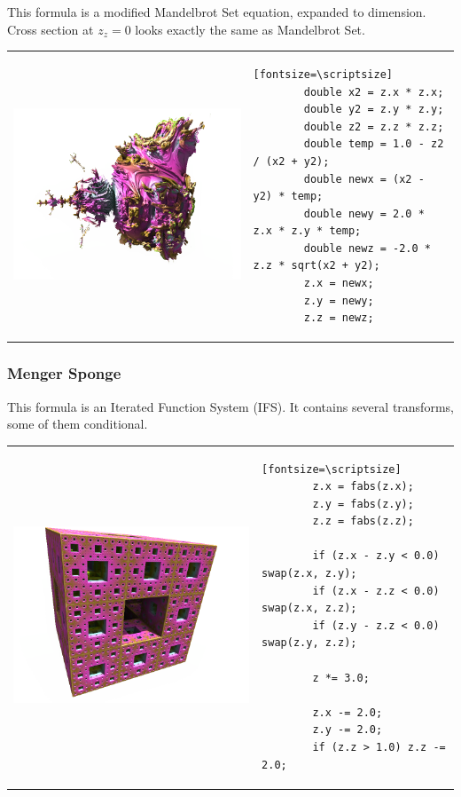 This formula is a modified Mandelbrot Set equation, expanded to  dimension.
Cross section at $ z_z = 0 $ looks exactly the same as Mandelbrot Set.
\nopagebreak

\begin{tabular}{l l}
	\includegraphics[width=0.3\linewidth]{img/manual/media/formula_mandelbulb_power_2}	
	& 
	\begin{minipage}[b]{0.5\linewidth}
		\begin{verbatim}[fontsize=\scriptsize]
		double x2 = z.x * z.x;
		double y2 = z.y * z.y;
		double z2 = z.z * z.z;
		double temp = 1.0 - z2 / (x2 + y2);
		double newx = (x2 - y2) * temp;
		double newy = 2.0 * z.x * z.y * temp;
		double newz = -2.0 * z.z * sqrt(x2 + y2);
		z.x = newx;
		z.y = newy;
		z.z = newz;
		\end{verbatim}
	\end{minipage}
\end{tabular} 

\subsubsection{Menger Sponge} \nopagebreak

This formula is an Iterated Function System (IFS). It contains several
transforms, some of them conditional. \nopagebreak

\begin{tabular}{l l}
	\includegraphics[width=0.3\linewidth]{img/manual/media/formula_menger_sponge.png}	
	& 
	\begin{minipage}[b]{0.5\linewidth}
		\begin{verbatim}[fontsize=\scriptsize]
		z.x = fabs(z.x);
		z.y = fabs(z.y);
		z.z = fabs(z.z);
		
		if (z.x - z.y < 0.0) swap(z.x, z.y);
		if (z.x - z.z < 0.0) swap(z.x, z.z);
		if (z.y - z.z < 0.0) swap(z.y, z.z);
		
		z *= 3.0;
		
		z.x -= 2.0;
		z.y -= 2.0;
		if (z.z > 1.0) z.z -= 2.0;
		\end{verbatim}
	\end{minipage}
\end{tabular} 

